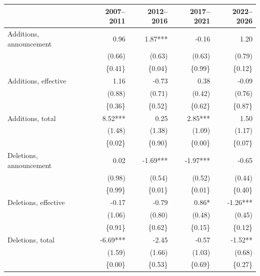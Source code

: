 \begin{tabular}{lrrrr}
\toprule
 & 2007–2011 & 2012–2016 & 2017–2021 & 2022–2026 \\
\midrule
Additions, announcement & 0.96 & 1.87*** & -0.16 & 1.20 \\
 & (0.66) & (0.63) & (0.63) & (0.79) \\
 & \{0.41\} & \{0.04\} & \{0.99\} & \{0.12\} \\
\addlinespace
Additions, effective & 1.16 & -0.73 & 0.38 & -0.09 \\
 & (0.88) & (0.71) & (0.42) & (0.76) \\
 & \{0.36\} & \{0.52\} & \{0.62\} & \{0.87\} \\
\addlinespace
Additions, total & 8.52*** & 0.25 & 2.85*** & 1.50 \\
 & (1.48) & (1.38) & (1.09) & (1.17) \\
 & \{0.02\} & \{0.90\} & \{0.00\} & \{0.07\} \\
\addlinespace
Deletions, announcement & 0.02 & -1.69*** & -1.97*** & -0.65 \\
 & (0.98) & (0.54) & (0.52) & (0.44) \\
 & \{0.99\} & \{0.01\} & \{0.01\} & \{0.40\} \\
\addlinespace
Deletions, effective & -0.17 & -0.79 & 0.86* & -1.26*** \\
 & (1.06) & (0.80) & (0.48) & (0.45) \\
 & \{0.91\} & \{0.62\} & \{0.15\} & \{0.12\} \\
\addlinespace
Deletions, total & -6.69*** & -2.45 & -0.57 & -1.52** \\
 & (1.59) & (1.66) & (1.03) & (0.68) \\
 & \{0.00\} & \{0.53\} & \{0.69\} & \{0.27\} \\
\bottomrule
\end{tabular}
